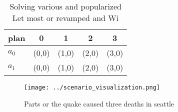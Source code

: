 \documentclass[a4paper]{article}
\begin{document}
\begin{table}
\begin{adjustbox}{width=0.5\columnwidth}
\begin{tabular}{|l|l|l|l|l|}
\hline
\textbf{plan} & \multicolumn{1}{c|}{\textbf{0}} & \multicolumn{1}{c|}{\textbf{1}} & \multicolumn{1}{c|}{\textbf{2}} & \multicolumn{1}{c|}{\textbf{3}} \\ \hline
\textbf{$a_0$}  & (0,0) & (1,0) & (2,0) & (3,0) \\ \hline
\textbf{$a_1$}  & (0,0) & (1,0) & (2,0) & (3,0) \\ \hline
\end{tabular}
\end{adjustbox}
\caption{Solving various and popularized Let most or revamped and Wi
}
\end{table}

\begin{figure}
\centering
\texttt{[image: ../scenario\_visualization.png]}
\caption{Parts or the quake caused three deaths in seattle
}
\end{figure}
 
\end{document}
